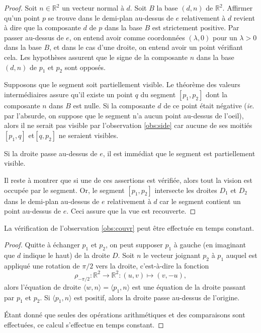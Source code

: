 \begin{proof}
  Soit $n\in \mathbb R^2$ un vecteur normal à $d$. Soit $B$ la base $(d, n)$
  de $\mathbb R^2$. Affirmer qu'un point $p$ se trouve
  dans le demi-plan au-dessus de $e$ relativement à $d$ revient à dire
  que la composante $d$ de $p$ dans la base $B$ est strictement
  positive. Par passer au-dessus de $e$, on entend avoir comme coordonnées
  $(\lambda, 0)$ pour un $\lambda >0$ dans la base $B$, et dans le cas d'une
  droite, on entend avoir un point vérifiant cela.
  Les hypothèses assurent que le signe de la composante $n$ dans la base
  $(d, n)$ de $p_1$ et $p_2$ sont opposés.

  Supposons que le segment soit partiellement visible. Le théorème
  des valeurs intermédiaires assure qu'il existe un point $q$ du segment
  $[p_1, p_2]$ dont la composante $n$ dans $B$ est nulle. Si la
  composante $d$ de ce point était négative (\emph{ie}. par l'absurde,
  on suppose que le segment n'a aucun point au-dessus de l'oeil),
  alors il ne serait pas visible par l'observation \ref{obs:side} 
  car aucune de ses moitiés $[p_1, q]$ et$[q, p_2]$ ne seraient visibles.

  Si la droite passe au-dessus de $e$, il est immédiat que le segment
  est partiellement visible.

  Il reste à montrer que si une de ces assertions est vérifiée, alors
  tout la vision est occupée par le segment. Or, le segment
  $[p_1, p_2]$ intersecte les droites $D_1$ et $D_2$ dans le demi-plan
  au-dessus de $e$ relativement à $d$ car le segment contient un point
  au-dessus de $e$. Ceci assure que la vue est recouverte.
\end{proof}
\begin{lem}\label{lem:couvr}
  La vérification de l'observation \ref{obs:couvr} peut être effectuée en
  temps constant.
\end{lem}
\begin{proof}
  Quitte à échanger $p_1$ et $p_2$, on peut supposer $p_1$ à gauche
  (en imaginant que $d$ indique le haut) de la droite $D$.
  Soit $n$ le vecteur joignant $p_2$ à $p_1$ auquel est appliqué
  une rotation de $\pi/2$ vers la droite, c'est-à-dire la fonction
  $$ \rho_{-\pi/2}:\mathbb R^2\to\mathbb R^2: (u, v)\mapsto (v, -u),$$
  alors l'équation de droite $\langle w, n\rangle = \langle p_1, n\rangle$
  est une équation de la droite passant par $p_1$ et $p_2$.
  Si $\langle p_1, n\rangle$ est positif, alors la droite passe au-dessus
  de l'origine.

  \'Etant donné que seules des opérations arithmétiques et des comparaisons
  sont effectuées, ce calcul s'effectue en temps constant.
\end{proof}

